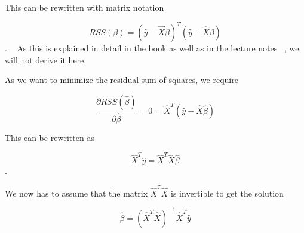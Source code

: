 This can be rewritten with matrix notation 

\begin{equation}
	RSS(\beta) = (\hat{y}-\vec{X}\beta)^T(\hat{y} - \hat{X}\beta)
\end{equation}. ~\cite{IntroStatistics} 
As this is explained in detail in the book as well as in the 
lecture notes ~\cite{Lectures-notes}, we will not derive
it here.

As we want to minimize the residual sum of squares, we require

\begin{equation}
	\frac{\partial RSS(\hat{\beta})}{\partial \hat{\beta}} 
	= 0 
	= \hat{X}^T(\hat{y} - \hat{X}\hat{\beta})
\end{equation}

This can be rewritten as 

\begin{equation}
	\hat{X}^T\hat{y} = \hat{X}^T\hat{X}\hat{\beta} 
\end{equation}.

We now has to assume that the matrix \(\hat{X}^T\hat{X}\) 
is invertible to get the solution

\begin{equation}
	\hat{\beta} = (\hat{X}^T\hat{X})^{-1}\hat{X}^T\hat{y}
\end{equation}
~\cite{Lectures-notes}




